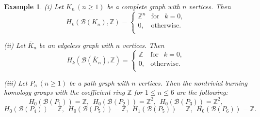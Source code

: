 \documentclass[a4paper, 11pt]{article}
\newtheorem{example}[theorem]{Example}
\begin{document}
\begin{example}\label{e5.7} \rm (i) Let $K_n\, (n\geq 1)$ be a complete graph with $n$ vertices. Then 
$$
H_k(\mathcal B(K_n), \mathbb Z)=\begin{cases} \mathbb Z^n& \text{for } \ \  k=0, \\
0, & \text{otherwise}.\\
\end{cases}
$$


(ii) Let   $\overline K_n$ be an edgeless graph with $n$ vertices.  
Then 
$$
H_k(\mathcal B(\overline K_n), \mathbb Z)=\begin{cases} \mathbb Z& \text{for } \ \  k=0, \\
0, & \text{otherwise}.\\
\end{cases}
$$






 
(iii) Let $P_n \, (n\geq 1)$ be a path graph with $n$ vertices. Then the nontrivial  burning homology groups with the coefficient ring $\mathbb Z$ for $1\leq n\leq 6$ are the  following:
$$
H_0(\mathcal B(P_1))=\mathbb Z, \ \ H_0(\mathcal B(P_2))=\mathbb Z^2, \ \ 
H_0(\mathcal B(P_3))=\mathbb Z^2, 
$$
$$ H_0(\mathcal B(P_4))=\mathbb Z, \ \ 
H_0(\mathcal B(P_5))=\mathbb Z, \ \ H_1(\mathcal B(P_5))=\mathbb Z,  \ \ 
H_0(\mathcal B(P_6))=\mathbb Z. 
$$
\end{example} 
\end{document}
